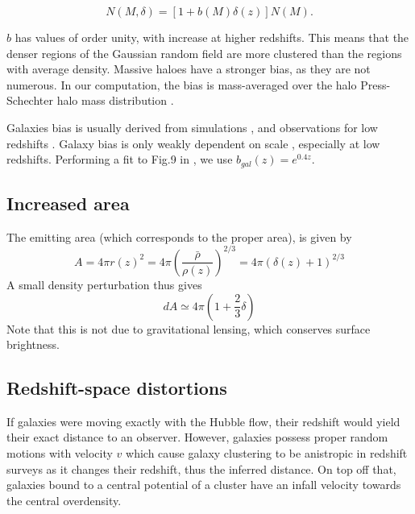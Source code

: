 \documentclass[twocolumns]{emulateapj}
\begin{document}
  \begin{equation}
    \label{eq:halo_bias}
    N(M,\delta)=[1+b(M)\delta(z)]N(M).
  \end{equation}

$b$ has values of order unity, with increase at higher redshifts. This means that the denser regions of the Gaussian random field are more clustered than the regions with average density. Massive haloes have a stronger bias, as they are not numerous.  In  our computation, the bias is mass-averaged over the halo Press-Schechter halo  mass distribution \citep{1999MNRAS.308..119S}.

 Galaxies bias is usually derived from simulations \citep{1999MNRAS.307..529K}, and observations for low redshifts \citep{2004ApJ...606..702T}. Galaxy bias is only weakly dependent on scale \citep{1998MNRAS.293..209M}, especially at low redshifts. Performing  a fit to Fig.9 in \citet{2004ApJ...601....1W}, we use $b_{gal}(z)=e^{0.4z}$. 


\subsection{Increased area}

 The emitting area (which corresponds to the proper area), is given by
  \begin{equation}
    \label{eq:emitting_area}
A=4\pi r(z)^2=4\pi\left(\frac{\bar{\rho}}{\rho(z)}\right)^{2/3}=4\pi(\delta(z)+1)^{2/3}
  \end{equation}
A small density perturbation thus gives
\begin{equation}
  \label{eq:pert_area}
dA\simeq 4\pi \left(1+\frac{2}{3}\delta\right)
\end{equation}
Note that this is not due to gravitational lensing, which conserves  surface brightness.


\subsection{Redshift-space distortions}
If galaxies were moving exactly with the Hubble flow, their redshift would yield their exact distance to an observer. However, galaxies possess proper random motions with velocity $v$ which cause galaxy clustering to be anistropic in redshift surveys as it changes their redshift, thus the inferred distance. On top off that, galaxies bound to a central potential of a cluster have an infall velocity towards the central overdensity.

\end{document}
